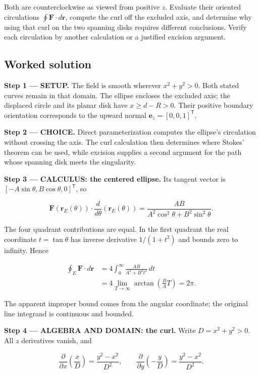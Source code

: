\documentclass[11pt,oneside,openany]{book}
\begin{document}
Both are counterclockwise as viewed from positive \(z\). Evaluate their oriented circulations \(\oint\mathbf F\cdot d\mathbf r\), compute the curl off the excluded axis, and determine why using that curl on the two spanning disks requires different conclusions. Verify each circulation by another calculation or a justified excision argument.
\subsection*{Worked solution}

\textbf{Step 1 --- SETUP.} The field is smooth wherever \(x^2+y^2>0\). Both stated curves remain in that domain. The ellipse encloses the excluded axis; the displaced circle and its planar disk have \(x\ge d-R>0\). Their positive boundary orientation corresponds to the upward normal \(\mathbf e_z=[0,0,1]^{\mathsf T}\).

\begin{ChoiceStep}
\textbf{Step 2 --- CHOICE.} Direct parameterization computes the ellipse's circulation without crossing the axis. The curl calculation then determines where Stokes' theorem can be used, while excision supplies a second argument for the path whose spanning disk meets the singularity.

\end{ChoiceStep}
\textbf{Step 3 --- CALCULUS: the centered ellipse.} Its tangent vector is \([-A\sin\theta,B\cos\theta,0]^{\mathsf T}\), so

\[
\mathbf F(\mathbf r_E(\theta))\cdot\frac{d}{d\theta}(\mathbf r_E(\theta))
=\frac{AB}{A^2\cos^2\theta+B^2\sin^2\theta}.
\]

The four quadrant contributions are equal. In the first quadrant the real coordinate \(t=\tan\theta\) has inverse derivative \(1/(1+t^2)\) and bounds zero to infinity. Hence

\[
\begin{aligned}
\oint_E\mathbf F\cdot d\mathbf r
&=4\int_0^\infty\frac{AB}{A^2+B^2t^2}\,dt\\
&=4\lim_{T\to\infty}\arctan\left(\frac BA T\right)
=2\pi.
\end{aligned}
\]

The apparent improper bound comes from the angular coordinate; the original line integrand is continuous and bounded.

\begingroup\color{AlgebraBlue}
\textbf{Step 4 --- ALGEBRA AND DOMAIN: the curl.} Write \(D=x^2+y^2>0\). All \(z\) derivatives vanish, and

\[
\frac{\partial}{\partial x}\left(\frac{x}{D}\right)
=\frac{y^2-x^2}{D^2},\qquad
\frac{\partial}{\partial y}\left(-\frac{y}{D}\right)
=\frac{y^2-x^2}{D^2}.
\]
\end{document}
